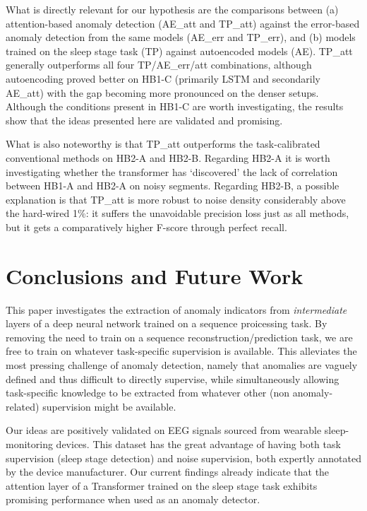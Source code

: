 \documentclass[conference]{IEEEtran}
\begin{document}
What is directly relevant for our hypothesis are the comparisons
between
(a) attention-based anomaly detection (AE\_att and TP\_att) against
the error-based anomaly detection from the same models (AE\_err and
TP\_err), and (b) models trained on the sleep stage task (TP) against
autoencoded models (AE).
TP\_att generally outperforms all four TP/AE\_err/att combinations,
although autoencoding proved better on HB1-C (primarily LSTM and
secondarily AE\_att) with the gap becoming more pronounced on the
denser setups. 
Although the conditions present in HB1-C are worth investigating,
the results show that the ideas presented here are validated and
promising.

What is also noteworthy is that TP\_att outperforms the
task-calibrated conventional methods on HB2-A and HB2-B.
Regarding HB2-A it is worth investigating whether the transformer has
`discovered' the lack of correlation between HB1-A and HB2-A on noisy
segments.
Regarding HB2-B, a possible explanation is that TP\_att is more robust
to noise density considerably above the hard-wired 1\%: it suffers
the unavoidable precision loss just as all methods, but it gets a
comparatively higher F-score through perfect recall.



\section{Conclusions and Future Work}
\label{sec:conc}

This paper investigates the extraction of anomaly indicators from
\emph{intermediate} layers of a deep neural network trained on a
sequence proicessing task. By removing the need to train on a sequence
reconstruction/prediction task, we are free to train on whatever
task-specific supervision is available. This alleviates the most
pressing challenge of anomaly detection, namely that anomalies are
vaguely defined and thus difficult to directly supervise, while
simultaneously allowing task-specific knowledge to be extracted from
whatever other (non anomaly-related) supervision might be available.

Our ideas are positively validated on EEG signals sourced from
wearable sleep-monitoring devices. This dataset has the great
advantage of having both task supervision (sleep stage detection) and
noise supervision, both expertly annotated by the device manufacturer.
Our current findings already indicate that the attention layer of a
Transformer trained on the sleep stage task exhibits promising
performance when used as an anomaly detector.
\end{document}
